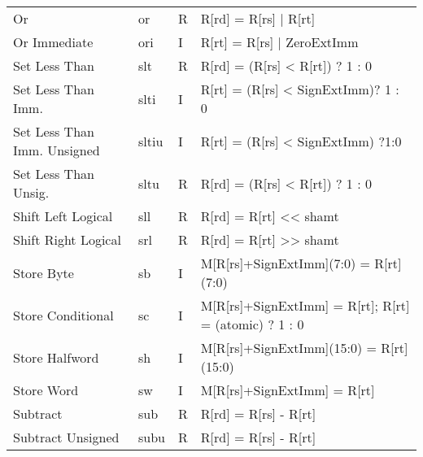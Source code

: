 \begin{tabular}{ l l l l }
 Or                          & or       & R      & R[rd] = R[rs] | R[rt]                                 \\
 Or Immediate                & ori      & I      & R[rt] = R[rs] | ZeroExtImm                            \\
 Set Less Than               & slt      & R      & R[rd] = (R[rs] < R[rt]) ? 1 : 0                       \\
 Set Less Than Imm.          & slti     & I      & R[rt] = (R[rs] < SignExtImm)? 1 : 0                   \\
 Set Less Than Imm. Unsigned & sltiu    & I      & R[rt] = (R[rs] < SignExtImm) ?1:0                     \\
 Set Less Than Unsig.        & sltu     & R      & R[rd] = (R[rs] < R[rt]) ? 1 : 0                       \\
 Shift Left Logical          & sll      & R      & R[rd] = R[rt] << shamt                                \\
 Shift Right Logical         & srl      & R      & R[rd] = R[rt] >> shamt                                \\
 Store Byte                  & sb       & I      & M[R[rs]+SignExtImm](7:0) = R[rt](7:0)                 \\
 Store Conditional           & sc       & I      & M[R[rs]+SignExtImm] = R[rt]; R[rt] = (atomic) ? 1 : 0 \\
 Store Halfword              & sh       & I      & M[R[rs]+SignExtImm](15:0) = R[rt](15:0)               \\
 Store Word                  & sw       & I      & M[R[rs]+SignExtImm] = R[rt]                           \\
 Subtract                    & sub      & R      & R[rd] = R[rs] - R[rt]                                 \\
 Subtract Unsigned           & subu     & R      & R[rd] = R[rs] - R[rt]                                 \\
\end{tabular}
